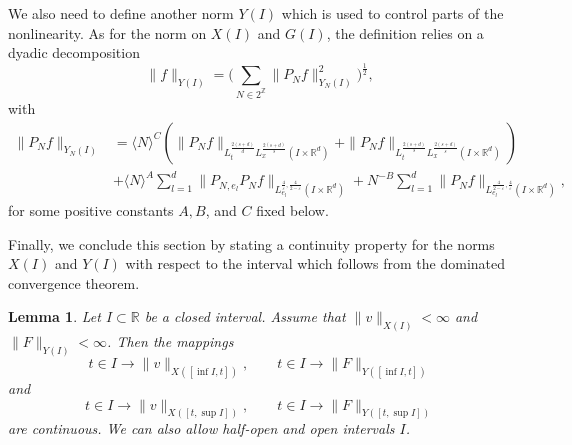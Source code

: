 \documentclass[10pt,leqno]{amsart}
\newtheorem{lem}[thm]{Lemma} %
\newcommand{\R}{\mathbb{R}} %
\numberwithin{equation}{section}
\newcommand{\Z}{\mathbb{Z}}
\begin{document}
We also need to define another norm $Y(I)$ which is used to control parts of the nonlinearity. As for the norm on $X(I)$ and $G(I)$, the definition relies on a dyadic decomposition
$$\|f\|_{Y(I)} = \Big(\sum_{N\in 2^{\Z}}  \|P_N f\|_{Y_N(I)}^2\Big)^{\frac{1}{2}},$$
with
\begin{equation}\label{defyn}
\begin{aligned}
\|P_N f\|_{Y_N(I)}&= \langle N\rangle^C \left(\|P_N f\|_{L_t^{\frac{2(s+d)}{d}} L_x^{\frac{2(s+d)}{s}} (I\times \R^d)} +\|P_N f\|_{L_t^{\frac{2(s+d)}{s}} L_x^{\frac{2(s+d)}{s}}(I\times \R^d) } \right)\\
&+\langle N\rangle^A \sum_{l=1}^d \|P_{N,e_l} P_N f \|_{L^{\frac{4}{\varepsilon},\frac{4}{2-\varepsilon}}_{e_l}(I\times \R^d) } +N^{-B} \sum_{l=1}^d \|P_N f\|_{L^{\frac{4}{2-\varepsilon},\frac{4}{\varepsilon}}_{e_l} (I\times \R^d) },  
\end{aligned}
\end{equation}
for some positive constants $A,B$, and $C$ fixed below.



Finally, we conclude this section by stating a continuity property for the norms $X(I)$ and $Y(I)$ with respect to the interval which follows from the dominated convergence theorem.

\begin{lem}
\label{lemcontt}
 Let $I\subset \R$ be a closed interval. Assume that $\|v\|_{X(I)}<\infty $  and $\|F\|_{Y(I)}<\infty$. Then the mappings
$$t\in I \rightarrow \|v\|_{X([\inf I,t])},\qquad t\in I \rightarrow \|F\|_{Y([\inf I,t])}$$
and
$$t\in I \rightarrow \|v\|_{X([t,\sup I])},\qquad t\in I \rightarrow \|F\|_{Y([t,\sup I])}$$
are continuous. We can also allow half-open and open intervals $I$.
\end{lem}
\end{document}
